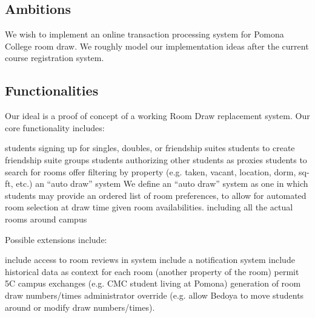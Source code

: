 \subsection{Ambitions}

We wish to implement an online transaction processing system for Pomona College
room draw. We roughly model our implementation ideas after the current course
registration system.

\subsection{Functionalities}

Our ideal is a proof of concept of a working Room Draw replacement system. Our
core functionality includes:

\begin{outline}
\1 students signing up for singles, doubles, or friendship suites
\1 students to create friendship suite groups
\1 students authorizing other students as proxies
\1 students to search for rooms
    \2 offer filtering by property (e.g. taken, vacant, location, dorm, sq-ft,
    etc.)
\1 an ``auto draw'' system
    \2 We define an ``auto draw'' system as one in which students may provide an
    ordered list of room preferences, to allow for automated room selection at
    draw time given room availabilities.
\1 including all the actual rooms around campus
\end{outline}

Possible extensions include:

\begin{outline}
\1 include access to room reviews in system
\1 include a notification system
\1 include historical data as context for each room (another property of the
    room)
\1 permit 5C campus exchanges (e.g. CMC student living at Pomona)
\1 generation of room draw numbers/times
\1 administrator override (e.g. allow Bedoya to move students around or modify
    draw numbers/times).
\end{outline}